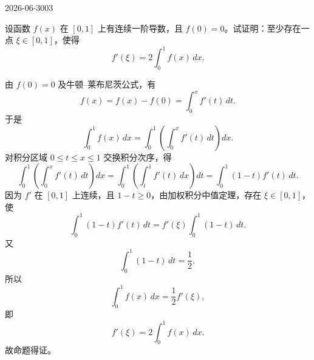 \begin{mistake}{2026-06-30}{03}

\begin{problemcontent}
设函数 \(f(x)\) 在 \([0,1]\) 上有连续一阶导数，且 \(f(0)=0\)。试证明：至少存在一点 \(\xi\in[0,1]\)，使得
\[
f'(\xi)=2\int_0^1 f(x)\,dx.
\]
\end{problemcontent}

\begin{solutioncontent}
由 \(f(0)=0\) 及牛顿--莱布尼茨公式，有
\[
f(x)=f(x)-f(0)=\int_0^x f'(t)\,dt.
\]
于是
\[
\int_0^1 f(x)\,dx
=\int_0^1\left(\int_0^x f'(t)\,dt\right)dx.
\]
对积分区域 \(0\le t\le x\le 1\) 交换积分次序，得
\[
\int_0^1\left(\int_0^x f'(t)\,dt\right)dx
=\int_0^1\left(\int_t^1 f'(t)\,dx\right)dt
=\int_0^1(1-t)f'(t)\,dt.
\]
因为 \(f'\) 在 \([0,1]\) 上连续，且 \(1-t\ge 0\)，由加权积分中值定理，存在 \(\xi\in[0,1]\)，使
\[
\int_0^1(1-t)f'(t)\,dt
=f'(\xi)\int_0^1(1-t)\,dt.
\]
又
\[
\int_0^1(1-t)\,dt=\frac12,
\]
所以
\[
\int_0^1 f(x)\,dx=\frac12 f'(\xi),
\]
即
\[
f'(\xi)=2\int_0^1 f(x)\,dx.
\]
故命题得证。
\end{solutioncontent}


\end{mistake}

